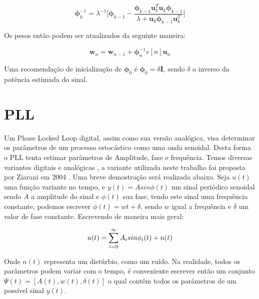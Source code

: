 \Large
\begin{equation}
\boldsymbol{\phi}^{-1}_k=\lambda^{-1}\Bigg[\boldsymbol{\phi}_{k-1}-\frac{\boldsymbol{\phi}_{k-1}\boldsymbol{u}^T_k\boldsymbol{u}_k\boldsymbol{\phi}_{k-1}}{\lambda+\boldsymbol{u}_k\boldsymbol{\phi}_{k-1}\boldsymbol{u}^T_k}\Bigg]
\end{equation}
\normalsize

\indent Os pesos então podem ser atualizados da seguinte maneira:

\begin{equation}
\boldsymbol{w}_{n}=\boldsymbol{w}_{n-1} +  \boldsymbol{\phi}_{n}^{-1}e[n] \boldsymbol{u}_{n}
\end{equation}

\indent Uma recomendação de inicialização de $\boldsymbol{\phi}_0$ é $\boldsymbol{\phi}_0=\delta \boldsymbol{I}$, sendo $\delta$ o inverso da potência estimada do sinal.






\section{PLL}

\indent Um Phase Locked Loop digital, assim como sua versão analógica, visa determinar os parâmetros de um processo estocástico como uma onda senoidal. Desta forma o PLL tenta estimar parâmetros de Amplitude, fase e frequência. Temos diversas variantes digitais e analógicas \cite{al2006digital}, a variante utilizada neste trabalho foi proposta por Ziarani em 2004 \cite{ziarani2004method}. Uma breve demostração será realizada abaixo.
\indent Seja $u(t)$ uma função variante no tempo, e $y(t)=Asin\phi(t)$ um sinal periódico senoidal sendo $A$ a amplitude do sinal e $\phi(t)$ sua fase, tendo este sinal uma frequência constante, podemos escrever $\phi(t)=wt+\delta$, sendo $w$ igual a frequência e $\delta$ um valor de fase constante. Escrevendo de maneira mais geral:

\begin{equation}
u(t)=\sum_{i=0}^{\infty}A_i sin\phi_i(t)\space+\space n(t)
\end{equation}

Onde $n(t)$ representa um distúrbio, como um ruído. Na realidade, todos os parâmetros podem variar com o tempo, é conveniente escrever então um conjunto $\Psi(t)=[A(t), w(t), \delta(t)]$ o qual contém todos os parâmetros de um possível sinal $y(t)$.

